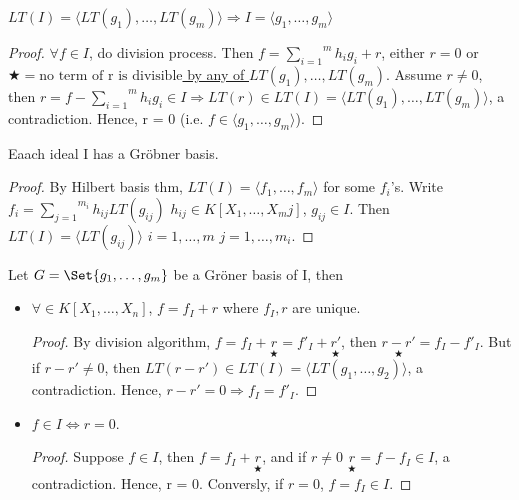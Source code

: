\begin{prop}
  $LT(I) = \langle LT(g_1),\dots,LT(g_m) \rangle \Rightarrow I = \langle g_1,\dots,g_m \rangle$
  \begin{proof}
    $\forall f \in I$, do division process. Then $f = \overset{m}{\underset{i = 1}{\sum}} h_ig_i+r$, either $r=0$ or \uline{$\bigstar = \text{no term of r is divisible}$ by any of $LT(g_1),\dots,LT(g_m)$}. Assume $r \neq 0$, then $r = f - \overset{m}{\underset{i = 1}{\sum}} h_i g_i \in I \Rightarrow LT(r) \in LT(I) = \langle LT(g_1),\dots, LT(g_m) \rangle$, a contradiction. Hence, r = 0 (i.e. $f\in \langle g_1,\dots,g_m \rangle$).
  \end{proof}
\end{prop}

\begin{theorem} \label{thm:Grobner_existense}
  Eaach ideal I has a Gr\"{o}bner basis.
  \begin{proof}
    By Hilbert basis thm, $LT(I) = \langle f_1,\dots,f_m \rangle$ for some $f_i$'s. Write $f_i = \overset{m_i}{\underset{j = 1}{\sum}}h_{ij}LT(g_{ij})$ $h_{ij} \in K[X_1,\dots,X_mj]$, $g_{ij} \in I$. Then $LT(I) = \langle LT(g_{ij}) \rangle$ $i=1,\dots,m$ $j=1,\dots,m_i$.
  \end{proof}
\end{theorem}

\begin{theorem} \label{thm:Grobner_property}
  Let $G = \Set{g_1,\dots,g_m}$ be a Gr\"{o}ner basis of I, then
  \begin{itemize}
    \item $\forall \in K[X_1,\dots,X_n]$, $f = f_I + r$ where $f_I,r$ are unique.
      \begin{proof}
        By division algorithm, $f = f_I +\underset{\bigstar}{r} = f'_I+\underset{\bigstar}{r'}$, then $\underset{\bigstar}{r-r'} = f_I-f'_I$. But if $r-r' \neq 0$, then $LT(r-r') \in LT(I) = \langle LT(g_1,\dots,g_2) \rangle$, a contradiction. Hence, $r-r' = 0\Rightarrow f_I = f'_I$.
      \end{proof}
    \item $f \in I \iff r=0$.
      \begin{proof}
        Suppose $f \in I$, then $f = f_I + \underset{\bigstar}{r}$, and if $r\neq 0$ $\underset{\bigstar}{r} = f - f_I\in I$, a contradiction. Hence, r = 0. Conversly, if $r = 0$, $f = f_I \in I$. 
      \end{proof}
  \end{itemize}
\end{theorem}


